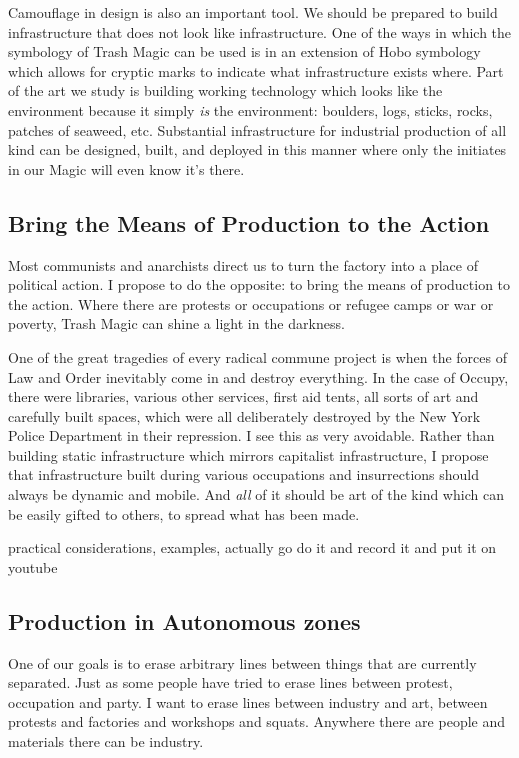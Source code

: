 Camouflage in design is also an important tool. We should be prepared to
build infrastructure that does not look like infrastructure. One of the
ways in which the symbology of Trash Magic can be used is in an
extension of Hobo symbology which allows for cryptic marks to indicate
what infrastructure exists where. Part of the art we study is building
working technology which looks like the environment because it simply
\emph{is} the environment: boulders, logs, sticks, rocks, patches of
seaweed, etc. Substantial infrastructure for industrial production of
all kind can be designed, built, and deployed in this manner where only
the initiates in our Magic will even know it's there.

\subsection{Bring the Means of Production to the
Action}\label{bring-the-means-of-production-to-the-action}

Most communists and anarchists direct us to turn the factory into a
place of political action. I propose to do the opposite: to bring the
means of production to the action. Where there are protests or
occupations or refugee camps or war or poverty, Trash Magic can shine a
light in the darkness.

One of the great tragedies of every radical commune project is when the
forces of Law and Order inevitably come in and destroy everything. In
the case of Occupy, there were libraries, various other services, first
aid tents, all sorts of art and carefully built spaces, which were all
deliberately destroyed by the New York Police Department in their
repression. I see this as very avoidable. Rather than building static
infrastructure which mirrors capitalist infrastructure, I propose that
infrastructure built during various occupations and insurrections should
always be dynamic and mobile. And \emph{all} of it should be art of the
kind which can be easily gifted to others, to spread what has been made.

practical considerations, examples, actually go do it and record it and
put it on youtube

\subsection{Production in Autonomous
zones}\label{production-in-autonomous-zones}

One of our goals is to erase arbitrary lines between things that are
currently separated. Just as some people have tried to erase lines
between protest, occupation and party. I want to erase lines between
industry and art, between protests and factories and workshops and
squats. Anywhere there are people and materials there can be industry.


